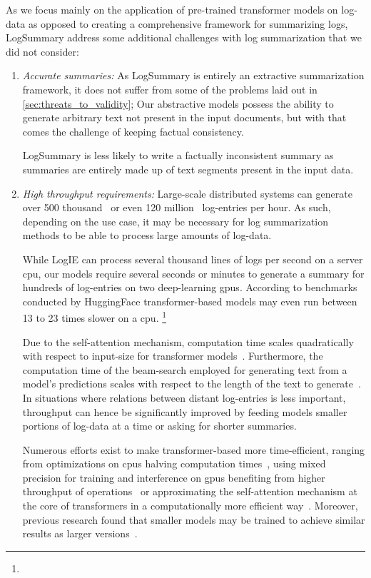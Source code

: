 As we focus mainly on the application of pre-trained transformer models on log-data
as opposed to creating a comprehensive framework for summarizing logs,
LogSummary address some additional challenges with log summarization that we did not consider:
\begin{enumerate}
\item \emph{Accurate summaries:} As LogSummary is entirely an extractive summarization framework,
      it does not suffer from some of the problems laid out in \autoref{sec:threats_to_validity};
      Our abstractive models possess the ability to generate arbitrary text not present in the input documents,
      but with that comes the challenge of keeping factual consistency.

      LogSummary is less likely to write a factually inconsistent summary
      as summaries are entirely made up of text segments present in the input data.
\item \emph{High throughput requirements:} Large-scale distributed systems can generate over 500 thousand~\parencites[126]{hdfs_dataset}[125]{logpai_logparser_benchmarks}
      or even 120 million~\parencites[1250]{cloud_diag} log-entries per hour.
      As such, depending on the use case,
      it may be necessary for log summarization methods to be able to process large amounts of log-data.

      While LogIE can process several thousand lines of logs per second on a server \ac{cpu},
      our models require several seconds or minutes to generate a summary for hundreds of log-entries on two deep-learning \acp{gpu}.
      According to benchmarks conducted by HuggingFace transformer-based models may even run between 13 to 23 times slower on a \ac{cpu}.%
      \footnote{}

      Due to the self-attention mechanism, computation time scales quadratically with respect to input-size for transformer models~\parencite[6]{transformer}.
      Furthermore, the computation time of the beam-search employed for generating text from a model's predictions scales with respect to the length of the text to generate~\parencite[5]{beam_search}.
      In situations where relations between distant log-entries is less important, throughput can hence be significantly improved
      by feeding models smaller portions of log-data at a time or asking for shorter summaries.

      Numerous efforts exist to make transformer-based more time-efficient,
      ranging from optimizations on \acp{cpu} halving computation times~\parencite{transformers_cpu_optimization},
      using mixed precision for training and interference on \acp{gpu}
      benefiting from higher throughput of operations~\parencite{nvidia_mixed_precision}
      or approximating the self-attention mechanism at the core of transformers in a computationally more efficient way~\parencites{bigbird}{nystroemformer}.
      Moreover, previous research found that smaller models may be trained to achieve similar results as larger versions~\parencites{distilbert}.


\end{enumerate}
